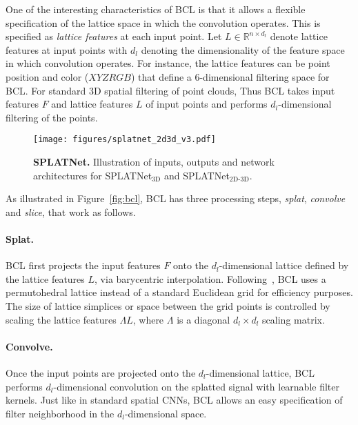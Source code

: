 \documentclass[10pt,twocolumn,letterpaper]{article}
\newcommand{\mycaption}[2]{\caption{\textbf{#1.}\xspace#2}}
\begin{document}
One of the interesting characteristics of BCL is that it allows a flexible specification
of the lattice space in which the convolution operates. This is specified as \emph{lattice features} at 
each input point. Let $L \in \mathbb{R}^{n \times d_l}$ denote lattice features at input points
with $d_l$ denoting the dimensionality of the feature space in which convolution operates.
For instance, the lattice features can be 
point position and color ($XYZRGB$)
that define a 6-dimensional filtering space for BCL. For standard 3D spatial filtering of point clouds,
Thus BCL takes input features $F$ and lattice features $L$ of input points and performs $d_l$-dimensional filtering of the points. 

\begin{figure*}[!ht]
    \vspace{-0.2cm}
    \centering
    \texttt{[image: figures/splatnet\_2d3d\_v3.pdf]}
    \vspace{-0.2cm}
    \mycaption{SPLATNet}{Illustration of inputs, outputs and network architectures for SPLATNet$_{\text{3D}}$ and SPLATNet$_{\text{2D-3D}}$.}
    \label{fig:splatnet}
    \vspace{-0.25cm}
\end{figure*}%
As illustrated in Figure~\ref{fig:bcl}, 
BCL has three processing steps, \emph{splat}, \emph{convolve} and \emph{slice}, that work as follows.

\vspace{-0.35cm}\paragraph{Splat.} BCL first projects the input features $F$ onto the $d_l$-dimensional
lattice defined by the lattice features $L$, via barycentric interpolation. 
Following~\cite{adams2010fast}, BCL uses a permutohedral
lattice instead of a standard Euclidean grid for efficiency purposes. The size of lattice simplices
or space between the grid points is controlled by scaling the lattice features $\Lambda L$,
where $\Lambda$ is a diagonal $d_l\times d_l$ scaling matrix.

\vspace{-0.35cm}\paragraph{Convolve.} Once the input points are projected onto the $d_l$-dimensional lattice,
BCL performs $d_l$-dimensional convolution on the splatted signal with learnable filter kernels.
Just like in standard spatial CNNs, BCL allows an easy specification of filter neighborhood in the $d_l$-dimensional space.
\end{document}
